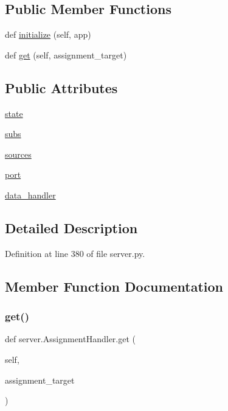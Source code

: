\subsection*{Public Member Functions}
\begin{DoxyCompactItemize}
\item 
def \hyperlink{classserver_1_1AssignmentHandler_a82430f14db86bf0a25245349bdec13b2}{initialize} (self, app)
\item 
def \hyperlink{classserver_1_1AssignmentHandler_aafff6382132dfeb120d0fd1889ab079c}{get} (self, assignment\+\_\+target)
\end{DoxyCompactItemize}
\subsection*{Public Attributes}
\begin{DoxyCompactItemize}
\item 
\hyperlink{classserver_1_1AssignmentHandler_a3530053d0649bd3b9cc31f7a5a7968d2}{state}
\item 
\hyperlink{classserver_1_1AssignmentHandler_a30b256ba03dc18275a5bbbd8865aaf0b}{subs}
\item 
\hyperlink{classserver_1_1AssignmentHandler_af8e15a70af1d39ae87ee9cf390ed67f3}{sources}
\item 
\hyperlink{classserver_1_1AssignmentHandler_ab199120f94601a0e4a221aa154a76da1}{port}
\item 
\hyperlink{classserver_1_1AssignmentHandler_a0aa25cd2a38359cd2dc7083ec5990228}{data\+\_\+handler}
\end{DoxyCompactItemize}


\subsection{Detailed Description}


Definition at line 380 of file server.\+py.



\subsection{Member Function Documentation}
\mbox{\label{classserver_1_1AssignmentHandler_aafff6382132dfeb120d0fd1889ab079c}} 
\subsubsection{\texorpdfstring{get()}{get()}}
{\footnotesize\ttfamily def server.\+Assignment\+Handler.\+get (\begin{DoxyParamCaption}\item[{}]{self,  }\item[{}]{assignment\+\_\+target }\end{DoxyParamCaption})}



